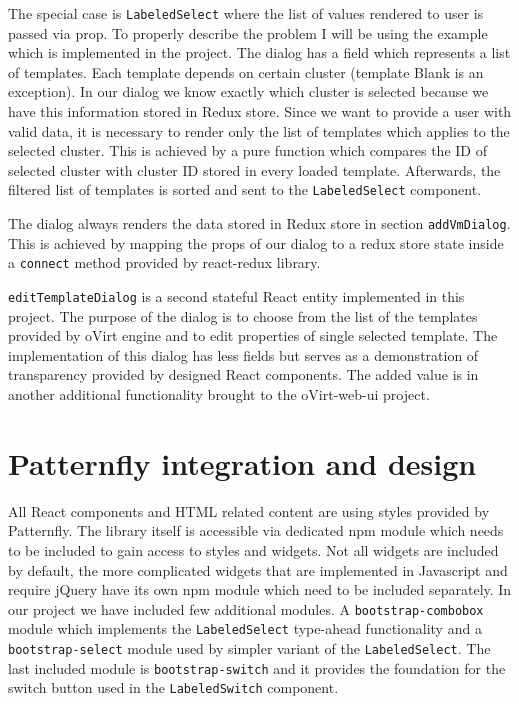 The special case is \texttt{LabeledSelect} where the list of values rendered to user is passed via prop. To properly describe the problem I will be using the example which is implemented in the project. The dialog has a field which represents a list of templates. Each template depends on certain cluster (template Blank is an exception). In our dialog we know exactly which cluster is selected because we have this information stored in Redux store. Since we want to provide a user with valid data, it is necessary to render only the list of templates which applies to the selected cluster. This is achieved by a pure function which compares the ID of selected cluster with cluster ID stored in every loaded template. Afterwards, the filtered list of templates is sorted and sent to the \texttt{LabeledSelect} component.

The dialog always renders the data stored in Redux store in section \texttt{addVmDialog}. This is achieved by mapping the props of our dialog to a redux store state inside a \texttt{connect} method provided by react-redux library. 

\texttt{editTemplateDialog} is a second stateful React entity implemented in this project. The purpose of the dialog is to choose from the list of the templates provided by oVirt engine and to edit properties of single selected template. The implementation of this dialog has less fields but serves as a demonstration of transparency provided by designed React components. The added value is in another additional functionality brought to the oVirt-web-ui project. 

\section{Patternfly integration and design}
All React components and HTML related content are using styles provided by Patternfly. The library itself is accessible via dedicated npm module which needs to be included to gain access to styles and widgets. Not all widgets are included by default, the more complicated widgets that are implemented in Javascript and require jQuery have its own npm module which need to be included separately. In our project we have included few additional modules. A \texttt{bootstrap-combobox} module which implements the \texttt{LabeledSelect} type-ahead functionality and a \texttt{bootstrap-select} module used by simpler variant of the \texttt{LabeledSelect}. The last included module is \texttt{bootstrap-switch} and it provides the foundation for the switch button used in the \texttt{LabeledSwitch} component.

